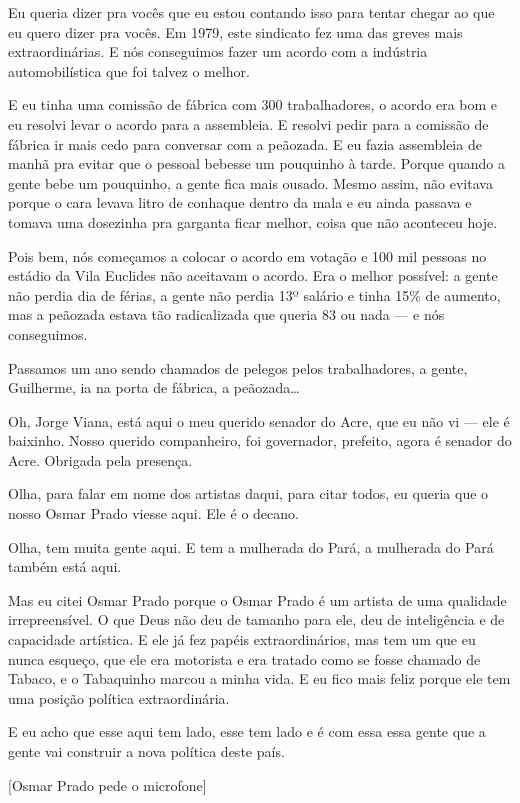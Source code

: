Eu queria dizer pra vocês que eu estou contando isso para tentar
chegar ao que eu quero dizer pra vocês. Em 1979, este sindicato fez uma
das greves mais extraordinárias. E nós conseguimos fazer um acordo com a
indústria automobilística que foi talvez o melhor.

E eu tinha uma comissão de fábrica com 300 trabalhadores, o acordo
era bom e eu resolvi levar o acordo para a assembleia. E resolvi pedir
para a comissão de fábrica ir mais cedo para conversar com a peãozada. E
eu fazia assembleia de manhã pra evitar que o pessoal bebesse um
pouquinho à tarde. Porque quando a gente bebe um pouquinho, a gente fica
mais ousado. Mesmo assim, não evitava porque o cara levava litro de
conhaque dentro da mala e eu ainda passava e tomava uma dosezinha pra
garganta ficar melhor, coisa que não aconteceu hoje.

Pois bem, nós começamos a colocar o acordo em votação e 100 mil
pessoas no estádio da Vila Euclides não aceitavam o acordo. Era o melhor
possível: a gente não perdia dia de férias, a gente não perdia 13º
salário e tinha 15\% de aumento, mas a peãozada estava tão radicalizada
que queria 83 ou nada --- e nós conseguimos.

Passamos um ano sendo chamados de pelegos pelos trabalhadores, a
gente, Guilherme, ia na porta de fábrica, a peãozada\ldots{}

Oh, Jorge Viana, está aqui o meu querido senador do Acre, que eu
não vi --- ele é baixinho. Nosso querido companheiro, foi governador,
prefeito, agora é senador do Acre. Obrigada pela presença.

Olha, para falar em nome dos artistas daqui, para citar todos, eu
queria que o nosso Osmar Prado viesse aqui. Ele é o decano.

Olha, tem muita gente aqui. E tem a mulherada do Pará, a mulherada
do Pará também está aqui.

Mas eu citei Osmar Prado porque o Osmar Prado é um artista de uma
qualidade irrepreensível. O que Deus não deu de tamanho para ele, deu de
inteligência e de capacidade artística. E ele já fez papéis
extraordinários, mas tem um que eu nunca esqueço, que ele era motorista
e era tratado como se fosse chamado de Tabaco, e o Tabaquinho marcou a
minha vida. E eu fico mais feliz porque ele tem uma posição política
extraordinária.

E eu acho que esse aqui tem lado, esse tem lado e é com essa essa
gente que a gente vai construir a nova política deste país.

[Osmar Prado pede o microfone]

